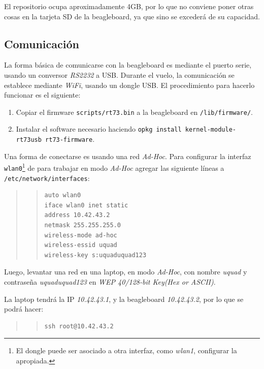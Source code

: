 \documentclass[main]{subfiles}
\begin{document}
El repositorio ocupa aproximadamente 4GB, por lo que no conviene poner otras cosas en la tarjeta SD de la beagleboard, ya que sino se excederá de su capacidad.

\subsection{Comunicación}
\label{sec:codigo:comunicacion}

La forma básica de comunicarse con la beagleboard es mediante el puerto serie, usando un conversor \textit{RS2232} a USB. Durante el vuelo, la comunicación se establece mediante \textit{WiFi}, usando un dongle USB. El procedimiento para hacerlo funcionar es el siguiente:

\begin{enumerate}
\item Copiar el firmware \verb+scripts/rt73.bin+ a la beagleboard en \verb+/lib/firmware/+.
\item Instalar el software necesario haciendo \newline\verb+opkg install kernel-module-rt73usb rt73-firmware+.
\end{enumerate}

Una forma de conectarse es usando una red \textit{Ad-Hoc}. Para configurar la interfaz \verb+wlan0+\footnote{El dongle puede ser asociado a otra interfaz, como \textit{wlan1}, configurar la apropiada.} de para trabajar en modo \textit{Ad-Hoc} agregar las siguiente líneas a \verb+/etc/network/interfaces+:
\begin{quote}
\begin{quote}
\begin{verbatim}
auto wlan0
iface wlan0 inet static
address 10.42.43.2
netmask 255.255.255.0
wireless-mode ad-hoc
wireless-essid uquad
wireless-key s:uquaduquad123
\end{verbatim}
\end{quote}
\end{quote}

Luego, levantar una red en una laptop, en modo \textit{Ad-Hoc}, con nombre \textit{uquad} y contraseña \textit{uquaduquad123} en \textit{WEP 40/128-bit Key(Hex or ASCII)}.

La laptop tendrá la IP \textit{10.42.43.1}, y la beagleboard \textit{10.42.43.2}, por lo que se podrá hacer:
\begin{quote}
\begin{quote}
\begin{verbatim}
ssh root@10.42.43.2
\end{verbatim}
\end{quote}
\end{quote}
\end{document}

